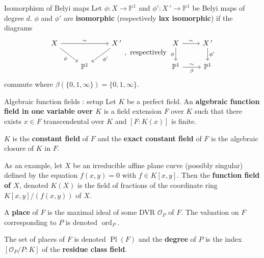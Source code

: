 \documentclass[handout,xcolor=dvipsnames]{beamer}
\theoremstyle{plain}
\newcommand{\PP}{\mathbb P}
\DeclareMathOperator{\ord}{ord}
\DeclareMathOperator{\Pl}{Pl}
\begin{document}
  \begin{frame}[fragile]{Isomorphism of Belyi maps}
    Let $\phi\colon X\to\PP^1$
    and
    $\phi'\colon X\,'\to\PP^1$
    be Belyi maps of degree $d$.
    \newline
    $\phi$ and $\phi'$ are
    \textbf{isomorphic}
    (respectively \textbf{lax isomorphic})
    if the diagrams
    \[
      \begin{tikzcd}
        X\arrow{rr}{\sim}\arrow{dr}[swap]{\phi}
        &
        &X\,'\arrow{dl}{\phi'}\\
        &\PP^1
      \end{tikzcd},
      \text{ respectively }
      \begin{tikzcd}
        X\arrow{r}{\sim}\arrow{d}[swap]{\phi}&X\,'\arrow{d}{\phi'}\\
        \PP^1\arrow{r}{\sim}[swap]{\beta}&\PP^1
      \end{tikzcd}
    \]
    commute
    where $\beta(\{0,1,\infty\}) = \{0,1,\infty\}$.
  \end{frame}
  \begin{frame}{Algebraic function fields : setup}
    Let $K$ be a perfect field.
    An \textbf{algebraic function field in one variable over $K$}
    is a field extension $F$ over $K$ such that there exists
    $x\in F$ transcendental over $K$ and
    $[F:K(x)]$ is finite.
    \par
    $K$ is the \textbf{constant field} of $F$
    and the \textbf{exact constant field} of $F$
    is the algebraic closure of $K$ in $F$.
    \par
    As an example,
    let $X$ be an irreducible affine plane curve
    (possibly singular)
    defined by the equation $f(x,y)=0$
    with $f\in K[x,y]$.
    Then the
    \textbf{function field of $X$},
    denoted $K(X)$ is the field of fractions
    of the coordinate ring $K[x,y]/(f(x,y))$
    of $X$.
    \par
    A \textbf{place} of $F$ is the maximal ideal
    of some DVR
    $\mathcal{O}_P$ of $F$.
    The valuation on $F$ corresponding to $P$ is
    denoted $\ord_P$.
    \par
    The set of places of $F$ is denoted
    $\Pl(F)$ and the \textbf{degree}
    of $P$ is the index
    $[\mathcal{O}_P/P:K]$ of the
    \textbf{residue class field}.
  \end{frame}
\end{document}
